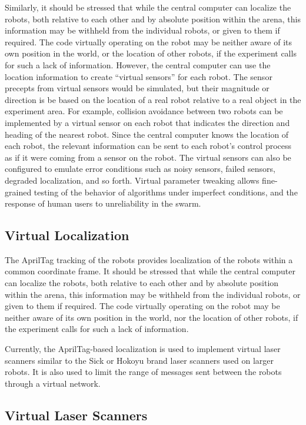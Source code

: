 \documentclass[]{article}
\begin{document}
Similarly, it should be stressed that while the central computer can localize the robots, both relative to each other and by absolute position within the arena, this information may be withheld from the individual robots, or given to them if required. 
The code virtually operating on the robot may be neither aware of its own position in the world, or the location of other robots, if the experiment calls for such a lack of information. 
However, the central computer can use the location information to create ``virtual sensors'' for each robot. 
The sensor precepts from virtual sensors would be simulated, but their magnitude or direction is be based on the location of a real robot relative to a real object in the experiment area. 
For example, collision avoidance between two robots can be implemented by a virtual sensor on each robot that indicates the direction and heading of the nearest robot. 
Since the central computer knows the location of each robot, the relevant information can be sent to each robot's control process as if it were coming from a sensor on the robot. 
The virtual sensors can also be configured to emulate error conditions such as noisy sensors, failed sensors, degraded localization, and so forth.
Virtual parameter tweaking allows fine-grained testing of the behavior of algorithms under imperfect conditions, and the response of human users to unreliability in the swarm. 

\subsection{Virtual Localization}

The AprilTag tracking of the robots provides localization of the robots within a common coordinate frame. 
It should be stressed that while the central computer can localize the robots, both relative to each other and by absolute position within the arena, this information may be withheld from the individual robots, or given to them if required. 
The code virtually operating on the robot may be neither aware of its own position in the world, nor the location of other robots, if the experiment calls for such a lack of information. 

Currently, the AprilTag-based localization is used to implement virtual laser scanners similar to the Sick or Hokoyu brand laser scanners used on larger robots. 
It is also used to limit the range of messages sent between the robots through a virtual network. 

\subsection{Virtual Laser Scanners}
\end{document}
